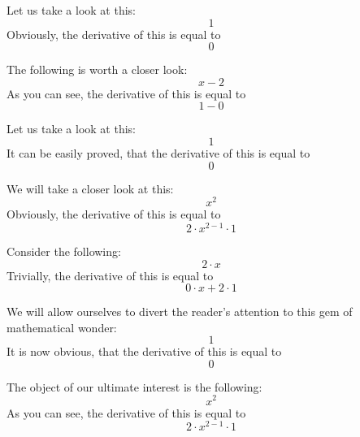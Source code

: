 \documentclass{article}
\begin{document}
Let us take a look at this:
\begin{equation}
1 
\end{equation}
Obviously, the derivative of this is equal to
\begin{equation}
0 
\end{equation}

The following is worth a closer look:
\begin{equation}
x - 2 
\end{equation}
As you can see, the derivative of this is equal to
\begin{equation}
1 - 0 
\end{equation}

Let us take a look at this:
\begin{equation}
1 
\end{equation}
It can be easily proved, that the derivative of this is equal to
\begin{equation}
0 
\end{equation}

We will take a closer look at this:
\begin{equation}
x ^{2 } 
\end{equation}
Obviously, the derivative of this is equal to
\begin{equation}
2 \cdot x ^{2 - 1 } \cdot 1 
\end{equation}

Consider the following:
\begin{equation}
2 \cdot x 
\end{equation}
Trivially, the derivative of this is equal to
\begin{equation}
0 \cdot x + 2 \cdot 1 
\end{equation}

We will allow ourselves to divert the reader's attention to this gem of mathematical wonder:
\begin{equation}
1 
\end{equation}
It is now obvious, that the derivative of this is equal to
\begin{equation}
0 
\end{equation}

The object of our ultimate interest is the following:
\begin{equation}
x ^{2 } 
\end{equation}
As you can see, the derivative of this is equal to
\begin{equation}
2 \cdot x ^{2 - 1 } \cdot 1 
\end{equation}
\end{document}
